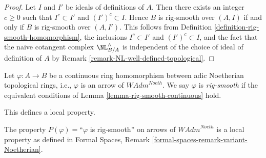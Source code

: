 \begin{proof}
Let $I$ and $I'$ be ideals of definitions of $A$. Then there exists an
integer $c \geq 0$ such that $I^c \subset I'$ and $(I')^c \subset I$. Hence
$B$ is rig-smooth over $(A, I)$ if and only if
$B$ is rig-smooth over $(A, I')$. This follows from
Definition \ref{definition-rig-smooth-homomorphism},
the inclusions $I^c \subset I'$ and $(I')^c \subset I$, and
the fact that the naive cotangent complex $\NL_{B/A}^\wedge$
is independent of the choice of ideal of definition of $A$ by
Remark \ref{remark-NL-well-defined-topological}.
\end{proof}

\begin{definition}
\label{definition-rig-smooth-continuous-homomorphism}
Let $\varphi : A \to B$ be a continuous ring homomorphism
between adic Noetherian topological rings, i.e., $\varphi$
is an arrow of $\textit{WAdm}^{Noeth}$. We say
$\varphi$ is {\it rig-smooth} if the equivalent conditions
of Lemma \ref{lemma-rig-smooth-continuous} hold.
\end{definition}

\noindent
This defines a local property.

\begin{lemma}
\label{lemma-rig-smooth-axioms}
The property $P(\varphi)=$``$\varphi$ is rig-smooth'' on arrows
of $\textit{WAdm}^{Noeth}$ is a local property as defined in
Formal Spaces, Remark \ref{formal-spaces-remark-variant-Noetherian}.
\end{lemma}


